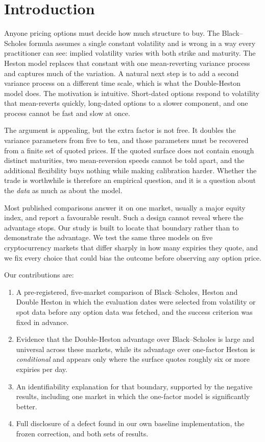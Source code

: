 \documentclass[runningheads]{llncs}
\begin{document}
\section{Introduction}

Anyone pricing options must decide how much structure to buy. The
Black--Scholes formula assumes a single constant volatility and is wrong in a
way every practitioner can see: implied volatility varies with both strike and
maturity. The Heston model replaces that constant with one mean-reverting
variance process and captures much of the variation. A natural next step is to
add a second variance process on a different time scale, which is what the
Double-Heston model does. The motivation is intuitive. Short-dated options
respond to volatility that mean-reverts quickly, long-dated options to a slower
component, and one process cannot be fast and slow at once.

The argument is appealing, but the extra factor is not free. It doubles the
variance parameters from five to ten, and those parameters must be recovered
from a finite set of quoted prices. If the quoted surface does not contain
enough distinct maturities, two mean-reversion speeds cannot be told apart, and
the additional flexibility buys nothing while making calibration harder.
Whether the trade is worthwhile is therefore an empirical question, and it is a
question about the \emph{data} as much as about the model.

Most published comparisons answer it on one market, usually a major equity
index, and report a favourable result. Such a design cannot reveal where the
advantage stops. Our study is built to locate that boundary rather than to
demonstrate the advantage. We test the same three models on five
cryptocurrency markets that differ sharply in how many expiries they quote, and
we fix every choice that could bias the outcome before observing any option
price.

Our contributions are:

\begin{enumerate}
\item A pre-registered, five-market comparison of Black--Scholes, Heston and
Double Heston in which the evaluation dates were selected from volatility or
spot data before any option data was fetched, and the success criterion was
fixed in advance.
\item Evidence that the Double-Heston advantage over Black--Scholes is large
and universal across these markets, while its advantage over one-factor Heston
is \emph{conditional} and appears only where the surface quotes roughly six or
more expiries per day.
\item An identifiability explanation for that boundary, supported by the
negative results, including one market in which the one-factor model is
significantly better.
\item Full disclosure of a defect found in our own baseline implementation,
the frozen correction, and both sets of results.
\end{enumerate}
\end{document}
